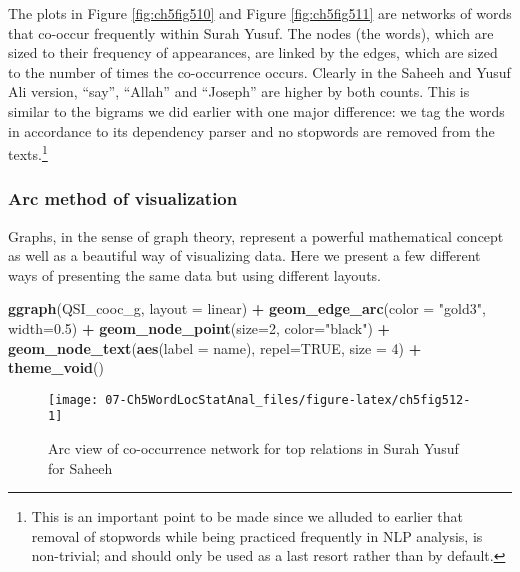 \documentclass[
]{article}
\newenvironment{Shaded}{\begin{snugshade}}{\end{snugshade}}
\newcommand{\AttributeTok}[1]{\textcolor[rgb]{0.13,0.29,0.53}{#1}}
\newcommand{\ConstantTok}[1]{\textcolor[rgb]{0.56,0.35,0.01}{#1}}
\newcommand{\DecValTok}[1]{\textcolor[rgb]{0.00,0.00,0.81}{#1}}
\newcommand{\FloatTok}[1]{\textcolor[rgb]{0.00,0.00,0.81}{#1}}
\newcommand{\FunctionTok}[1]{\textcolor[rgb]{0.13,0.29,0.53}{\textbf{#1}}}
\newcommand{\NormalTok}[1]{#1}
\newcommand{\SpecialCharTok}[1]{\textcolor[rgb]{0.81,0.36,0.00}{\textbf{#1}}}
\newcommand{\StringTok}[1]{\textcolor[rgb]{0.31,0.60,0.02}{#1}}
\begin{document}
The plots in Figure \ref{fig:ch5fig510} and Figure \ref{fig:ch5fig511} are networks of words that co-occur frequently within Surah Yusuf. The nodes (the words), which are sized to their frequency of appearances, are linked by the edges, which are sized to the number of times the co-occurrence occurs. Clearly in the Saheeh and Yusuf Ali version, ``say'', ``Allah'' and ``Joseph'' are higher by both counts. This is similar to the bigrams we did earlier with one major difference: we tag the words in accordance to its dependency parser and no stopwords are removed from the texts.\footnote{This is an important point to be made since we alluded to earlier that removal of stopwords while being practiced frequently in NLP analysis, is non-trivial; and should only be used as a last resort rather than by default.}

\hypertarget{arc-method-of-visualization}{%
\subsubsection{Arc method of visualization}\label{arc-method-of-visualization}}

Graphs, in the sense of graph theory, represent a powerful mathematical concept as well as a beautiful way of visualizing data. Here we present a few different ways of presenting the same data but using different layouts.

\begin{Shaded}
\begin{Highlighting}[]
\FunctionTok{ggraph}\NormalTok{(QSI\_cooc\_g, }\AttributeTok{layout =} \StringTok{\textquotesingle{}linear\textquotesingle{}}\NormalTok{) }\SpecialCharTok{+} 
    \FunctionTok{geom\_edge\_arc}\NormalTok{(}\AttributeTok{color =} \StringTok{"gold3"}\NormalTok{, }\AttributeTok{width=}\FloatTok{0.5}\NormalTok{) }\SpecialCharTok{+}
    \FunctionTok{geom\_node\_point}\NormalTok{(}\AttributeTok{size=}\DecValTok{2}\NormalTok{, }\AttributeTok{color=}\StringTok{"black"}\NormalTok{) }\SpecialCharTok{+}
    \FunctionTok{geom\_node\_text}\NormalTok{(}\FunctionTok{aes}\NormalTok{(}\AttributeTok{label =}\NormalTok{ name), }\AttributeTok{repel=}\ConstantTok{TRUE}\NormalTok{, }\AttributeTok{size =} \DecValTok{4}\NormalTok{) }\SpecialCharTok{+}
    \FunctionTok{theme\_void}\NormalTok{()}
\end{Highlighting}
\end{Shaded}

\begin{figure}

{\centering \texttt{[image: 07-Ch5WordLocStatAnal\_files/figure-latex/ch5fig512-1]} 

}

\caption{Arc view of co-occurrence network for top relations in Surah Yusuf for Saheeh}\label{fig:ch5fig512}
\end{figure}
\end{document}
